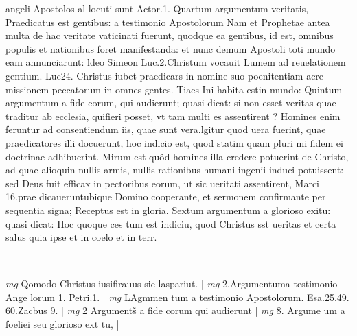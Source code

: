 \documentclass{article}
\begin{document}
\begin{pages}
angeli Apostolos al locuti sunt Actor.1.  \pend\pstart Quartum argumentum veritatis, Praedicatus est gentibus: a testimonio Apostolorum Nam et Prophetae antea multa de hac veritate vaticinati fuerunt, quodque ea gentibus, id est, omnibus populis et nationibus foret manifestanda: et nunc demum Apostoli toti mundo eam annunciarunt: ldeo Simeon Luc.2.Christum vocauit Lumem ad reuelationem gentium. Luc24. Christus iubet praedicars in nomine suo poenitentiam acre missionem peccatorum in omnes gentes.  \pend\pstart Tiaes Ini habita estin mundo: Quintum argumentum a fide eorum, qui audierunt; quasi dicat: si non esset veritas quae traditur ab ecclesia, quifieri posset, vt tam multi es assentirent ? Homines enim feruntur ad consentiendum iis, quae sunt vera.lgitur quod uera fuerint, quae praedicatores illi docuerunt, hoc indicio est, quod statim quam pluri mi fidem ei doctrinae adhibuerint. Mirum est quôd homines illa credere potuerint de Christo, ad quae alioquin nullis armis, nullis rationibus humani ingenii induci potuissent: sed Deus fuit efficax in pectoribus eorum, ut sic ueritati assentirent, Marci 16.prae dicaueruntubique Domino cooperante, et sermonem confirmante per sequentia signa; Receptus est in gloria. Sextum argumentum a glorioso exitu: quasi dicat: Hoc quoque ces tum est indiciu, quod Christus sst ueritas et certa salus quia ipse et in coelo et in terr.  \pend
\vspace{0.5cm}\noindent
\vspace{0.2cm}\rule{1cm}{0.2pt}\\ 
\hspace{0.2cm}\textit{mg}
\footnotesize Qomodo Christus iusifirauus sie laspariut. 
\normalsize| 
\hspace{0.2cm}\textit{mg}
\footnotesize 2.Argumentuma testimonio Ange lorum 1. Petri.1. 
\normalsize| 
\hspace{0.2cm}\textit{mg}
\footnotesize LAgmmen tum a testimonio Apostolorum. Esa.25.49. 60.Zacbus 9. 
\normalsize| 
\hspace{0.2cm}\textit{mg}
\footnotesize 2 Arguments̃ a fide corum qui audierunt 
\normalsize| 
\hspace{0.2cm}\textit{mg}
\footnotesize 8. Argume um a foeliei seu glorioso ext tu, 
\normalsize| 

\end{pages}
\end{document}
